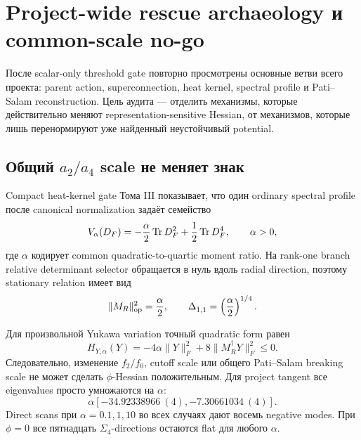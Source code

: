 \section{Project-wide rescue archaeology и common-scale no-go}

После scalar-only threshold gate повторно просмотрены основные ветви всего
проекта: parent action, superconnection, heat kernel, spectral profile и
Pati--Salam reconstruction. Цель аудита --- отделить механизмы, которые
действительно меняют representation-sensitive Hessian, от механизмов,
которые лишь перенормируют уже найденный неустойчивый potential.

\subsection{Общий \texorpdfstring{\(a_2/a_4\)}{a2/a4} scale не меняет знак}

Compact heat-kernel gate Тома III показывает, что один ordinary spectral
profile после canonical normalization задаёт семейство
\begin{equation}
 V_\alpha(D_F)
 =-\frac\alpha2\operatorname{Tr} D_F^2+\frac12\operatorname{Tr} D_F^4,
 \qquad \alpha>0,
 \label{eq:ps-common-scale-family}
\end{equation}
где \(\alpha\) кодирует common quadratic-to-quartic moment ratio. На
rank-one branch relative determinant selector обращается в нуль вдоль
radial direction, поэтому stationary relation имеет вид
\begin{equation}
 \|M_R\|_{\rm op}^2=\frac\alpha2,
 \qquad
 \Delta_{\dot1,1}=\left(\frac\alpha2\right)^{1/4}.
\end{equation}

Для произвольной Yukawa variation точный quadratic form равен
\begin{equation}
 \boxed{
 H_{Y,\alpha}(Y)
 =-4\alpha\|Y\|_F^2+8\|M_R^\dagger Y\|_F^2
 \le0.}
 \label{eq:ps-common-scale-yukawa-no-go}
\end{equation}
Следовательно, изменение \(f_2/f_0\), cutoff scale или общего
Pati--Salam breaking scale не может сделать \(\phi\)-Hessian положительным.
Для project tangent все eigenvalues просто умножаются на \(\alpha\):
\begin{equation}
 \alpha\left[-34.92338966\ (4),-7.30661034\ (4)\right].
\end{equation}
Direct scans при \(\alpha=0.1,1,10\) во всех случаях дают восемь negative
modes. При \(\phi=0\) все пятнадцать \(\Sigma_4\)-directions остаются flat
для любого \(\alpha\).

